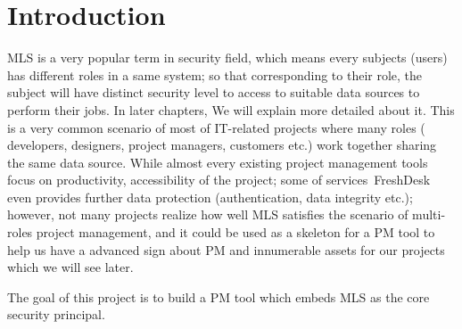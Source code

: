 
\chapter{Introduction} %

\label{ch:introduction} %


MLS is a very popular term in security field, which means every subjects (\ie users) has different roles in a same system; so that corresponding to their role, the subject will have distinct security level to access to suitable data sources to perform their jobs. In later chapters, We will explain more detailed about it. This is a very common scenario of most of IT-related projects where many roles (\eg\,developers, designers, project managers, customers etc.) work together sharing the same data source. While almost every existing project management tools focus on productivity, accessibility of the project; some of services \eg\,FreshDesk even provides further data protection (authentication, data integrity etc.); however, not many projects realize how well MLS satisfies the scenario of multi-roles project management, and it could be used as a skeleton for a PM tool to help us have a advanced sign about PM and innumerable assets for our projects which we will see later.

The goal of this project is to build a PM tool which embeds MLS as the core security principal. 

